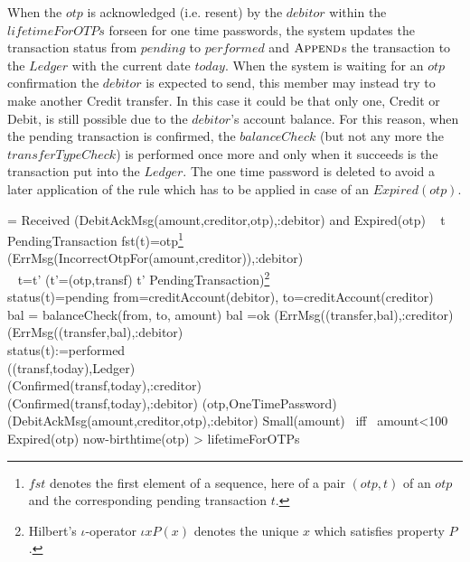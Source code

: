 When the $otp$ is acknowledged (i.e. resent) by the $debitor$ 
within the $lifetimeForOTPs$ forseen for one time passwords, the system updates the transaction status from $pending$ to $performed$ and 
$\hbox{\sc Append}$s the transaction to the $Ledger$ with the current date $today$. When the system is waiting for an $otp$ confirmation the $debitor$ is expected to send, this member may instead try to make another Credit transfer. In this case it could be that only one, Credit or Debit, is still possible due to the $debitor$'s account balance. For this reason, when the pending transaction is confirmed, the $balanceCheck$  (but not any more the $transferTypeCheck$) is performed once more and only when it succeeds is the transaction put into the $Ledger$. The one time password is deleted to avoid a later application of the rule which has to be applied in case of an $Expired(otp)$. 
              
 \begin{asm}  
  =\+           
\IF Received
     (DebitAckMsg(amount,creditor,otp),\FROM :debitor) and \NOT Expired(otp) \THEN \+ 
  \IF ~ \THEREISNO t \in PendingTransaction \WITH fst(t)=otp\footnote{$fst$ denotes the first element of a sequence, here of a pair $(otp,t)$ of an $otp$ and the corresponding pending transaction $t$.} \+
     \THEN  ~ (ErrMsg(IncorrectOtpFor(amount,creditor)),\TO :debitor) \\
  \ELSE ~\+
     \LET t=\iota t' (t'=(otp,transf) \mid t'  \in PendingTransaction)\footnote{Hilbert's $\iota$-operator $\iota x P(x)$ denotes the unique $x$ which satisfies property  $P$.}\\
     \IF status(t)=pending \THEN \+
        \LET from=creditAccount(debitor), to=creditAccount(creditor)\\
        \LET bal = balanceCheck(from, to, amount) \+
          \IF bal \not =ok \THEN \+
             (ErrMsg((transfer,bal),\TO :creditor)\\
             (ErrMsg((transfer,bal),\TO :debitor) \\
              \ELSE \+
                status(t):=performed \\
                ((transf,today),Ledger) \\
                (Confirmed(transf,today),\TO :creditor)\\
                (Confirmed(transf,today),\TO :debitor)\dec\dec\-
                 (otp,OneTimePassword)\dec\dec\-  
  (DebitAckMsg(amount,creditor,otp),\FROM :debitor) \dec\-
\WHERE \+
Small(amount) \mbox{ iff } amount<100\\
Expired(otp) \IFF now-birthtime(otp) > lifetimeForOTPs
\end{asm}

